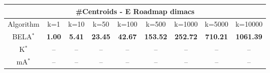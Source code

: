 \begin{tabular}{c|cccccccc}\toprule
\multicolumn{9}{c}{#Centroids - E Roadmap dimacs}\\ \midrule
Algorithm & k=1 & k=10 & k=50 & k=100 & k=500 & k=1000 & k=5000 & k=10000 \\ \midrule
BELA$^*$ & \textbf{1.00} & \textbf{5.41} & \textbf{23.45} & \textbf{42.67} & \textbf{153.52} & \textbf{252.72} & \textbf{710.21} & \textbf{1061.39} \\
K$^*$ & -- & -- & -- & -- & -- & -- & -- & -- \\
mA$^*$ & -- & -- & -- & -- & -- & -- & -- & -- \\ \bottomrule 
\end{tabular}
